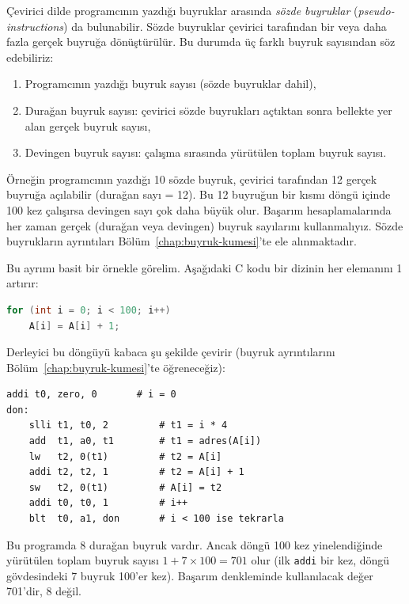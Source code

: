 \begin{bilginot}
Çevirici dilde programcının yazdığı buyruklar arasında \emph{sözde buyruklar} (\emph{pseudo-instructions}) da bulunabilir. Sözde buyruklar çevirici tarafından bir veya daha fazla gerçek buyruğa dönüştürülür. Bu durumda üç farklı buyruk sayısından söz edebiliriz:
\begin{enumerate}
\item Programcının yazdığı buyruk sayısı (sözde buyruklar dahil),
\item Durağan buyruk sayısı: çevirici sözde buyrukları açtıktan sonra bellekte yer alan gerçek buyruk sayısı,
\item Devingen buyruk sayısı: çalışma sırasında yürütülen toplam buyruk sayısı.
\end{enumerate}
Örneğin programcının yazdığı 10 sözde buyruk, çevirici tarafından 12 gerçek buyruğa açılabilir (durağan sayı = 12). Bu 12 buyruğun bir kısmı döngü içinde 100 kez çalışırsa devingen sayı çok daha büyük olur. Başarım hesaplamalarında her zaman gerçek (durağan veya devingen) buyruk sayılarını kullanmalıyız. Sözde buyrukların ayrıntıları Bölüm~\ref{chap:buyruk-kumesi}'te ele alınmaktadır.
\end{bilginot}

Bu ayrımı basit bir örnekle görelim. Aşağıdaki C kodu bir dizinin her elemanını 1 artırır:

\begin{lstlisting}[language=C]
for (int i = 0; i < 100; i++)
    A[i] = A[i] + 1;
\end{lstlisting}

Derleyici bu döngüyü kabaca şu şekilde çevirir (buyruk ayrıntılarını Bölüm~\ref{chap:buyruk-kumesi}'te öğreneceğiz):

\begin{lstlisting}[style=riscv]
    addi t0, zero, 0       # i = 0
don:
    slli t1, t0, 2         # t1 = i * 4
    add  t1, a0, t1        # t1 = adres(A[i])
    lw   t2, 0(t1)         # t2 = A[i]
    addi t2, t2, 1         # t2 = A[i] + 1
    sw   t2, 0(t1)         # A[i] = t2
    addi t0, t0, 1         # i++
    blt  t0, a1, don       # i < 100 ise tekrarla
\end{lstlisting}

Bu programda 8 durağan buyruk vardır. Ancak döngü 100 kez yinelendiğinde yürütülen toplam buyruk sayısı $1 + 7 \times 100 = 701$ olur (ilk \texttt{addi} bir kez, döngü gövdesindeki 7 buyruk 100'er kez). Başarım denkleminde kullanılacak değer 701'dir, 8 değil.

